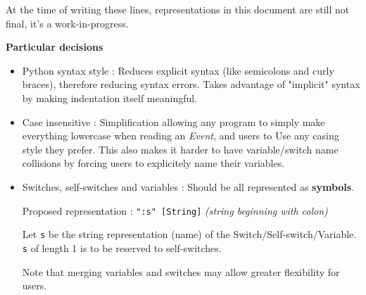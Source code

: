 \documentclass[11pt]{article}
\begin{document}
At the time of writing these lines, representations in this document are still not final, it's a work-in-progress.

\textbf{Particular decisions}
\begin{itemize}
	\item Python syntax style : Reduces explicit syntax (like semicolons and curly braces), therefore reducing syntax errors. Takes advantage of "implicit" syntax by making indentation itself meaningful.
	
	\item Case insensitive : Simplification allowing any program to simply make everything lowercase when reading an \textit{Event}, and users to Use any casing style they prefer. This also makes it harder to have variable/switch name collisions by forcing users to explicitely name their variables.
	
	\item Switches, self-switches and variables : Should be all represented as \textbf{symbols}. 
	
	Proposed representation : \verb|":s" [String]| \textit{(string beginning with colon)}
	
	Let \verb|s| be the string representation (name) of the Switch/Self-switch/Variable. \verb|s| of length 1 is to be reserved to self-switches.
	
	Note that merging variables and switches may allow greater flexibility for users.
	
\end{itemize}
\end{document}
